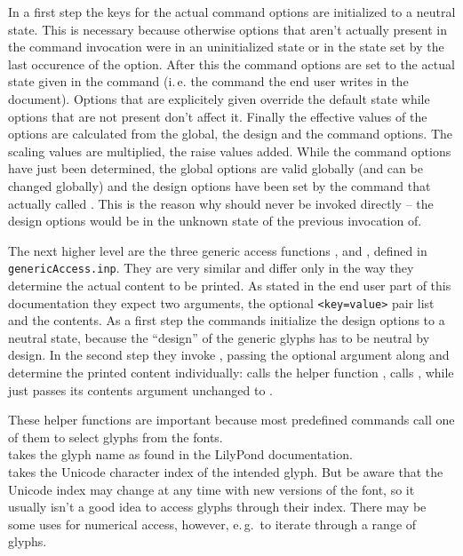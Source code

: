 \documentclass{article}
\begin{document}
In a first step the keys for the actual command options are initialized to a neutral state.
This is necessary because otherwise options that aren't actually present in the command invocation were in an uninitialized state or in the state set by the last occurence of the option.
After this the command options are set to the actual state given in the command (i.\,e. the command the end user writes in the document).
Options that are explicitely given override the default state while options that are not present don't affect it.
Finally the effective values of the options are calculated from the global, the design and the command options. 
The scaling values are multiplied, the raise values added.
While the command options have just been determined, the global options are valid globally (and can be changed globally) and the design options have been set by the command that actually called .
This is the reason why  should never be invoked directly -- the design options would be in the unknown state of the previous invocation of.

\medskip
The next higher level are the three generic access functions ,  and , defined in \texttt{genericAccess.inp}.
They are very similar and differ only in the way they determine the actual content to be printed.
As stated in the end user part of this documentation they expect two arguments, the optional \texttt{<key=value>} pair list and the contents.
As a first step the commands initialize the design options to a neutral state, because the \enquote{design} of the generic glyphs has to be neutral by design.
In the second step they invoke , passing the optional argument along and determine the printed content individually:
 calls the helper function ,  calls , while  just passes its contents argument unchanged to .

\medskip
These helper functions are important because most predefined commands call one of them to select glyphs from the \emmentaler fonts.\\
 takes the glyph name as found in the LilyPond documentation.\\
 takes the Unicode character index of the intended glyph.
But be aware that the Unicode index may change at any time with new versions of the \emmentaler font, so it usually isn't a good idea to access glyphs through their index.
There may be some uses for numerical access, however, e.\,g.\ to iterate through a range of glyphs.
\end{document}

